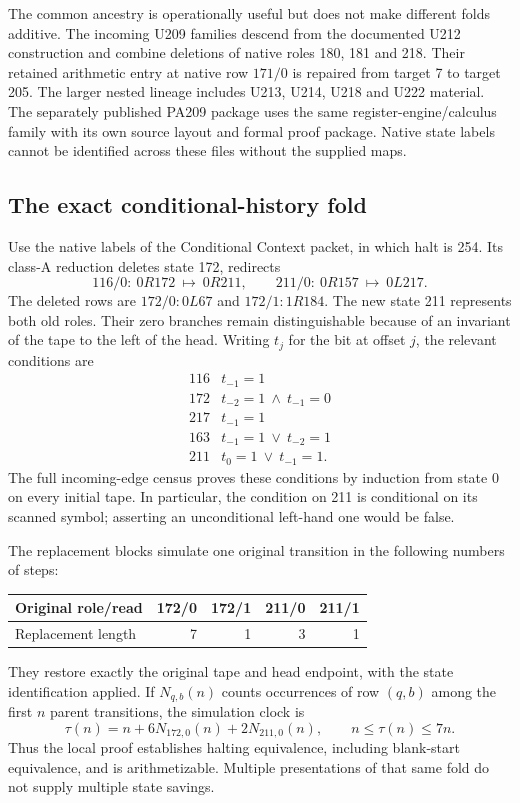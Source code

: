 \documentclass[11pt,a4paper]{article}
\begin{document}
The common ancestry is operationally useful but does not make different
folds additive. The incoming U209 families descend from the documented
U212 construction and combine deletions of native roles 180, 181 and
218. Their retained arithmetic entry at native row $171/0$ is repaired
from target 7 to target 205. The larger nested lineage includes U213,
U214, U218 and U222 material. The separately published PA209 package
uses the same register-engine/calculus family with its own source layout
and formal proof package. Native state labels cannot be identified
across these files without the supplied maps.

\subsection{The exact conditional-history fold}

Use the native labels of the Conditional Context packet, in which halt
is 254. Its class-A reduction deletes state 172, redirects
\[
 116/0:\ 0R172\ \longmapsto\ 0R211,
 \qquad
 211/0:\ 0R157\ \longmapsto\ 0L217.
\]
The deleted rows are $172/0:0L67$ and $172/1:1R184$.
The new state 211 represents both old roles. Their zero branches remain
distinguishable because of an invariant of the tape to the left of the
head. Writing $t_j$ for the bit at offset $j$, the relevant conditions are
\[
\begin{array}{c|l}
116&t_{-1}=1\\
172&t_{-2}=1\ \land\ t_{-1}=0\\
217&t_{-1}=1\\
163&t_{-1}=1\ \lor\ t_{-2}=1\\
211&t_0=1\ \lor\ t_{-1}=1.
\end{array}
\]
The full incoming-edge census proves these conditions by induction from
state 0 on every initial tape. In particular, the condition on 211 is
conditional on its scanned symbol; asserting an unconditional left-hand
one would be false.

The replacement blocks simulate one original transition in the following
numbers of steps:
\begin{center}
\begin{tabular}{@{}lrrrr@{}}
\toprule
Original role/read &172/0&172/1&211/0&211/1\\\midrule
Replacement length&7&1&3&1\\\bottomrule
\end{tabular}
\end{center}
They restore exactly the original tape and head endpoint, with the state
identification applied. If $N_{q,b}(n)$ counts occurrences of row $(q,b)$
among the first $n$ parent transitions, the simulation clock is
\[
 \tau(n)=n+6N_{172,0}(n)+2N_{211,0}(n),\qquad n\le\tau(n)\le7n.
\]
Thus the local proof establishes halting equivalence, including blank-start
equivalence, and is arithmetizable. Multiple presentations of that same
fold do not supply multiple state savings.
\end{document}
